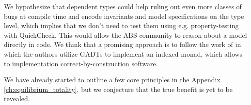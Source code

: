 We hypothesize that dependent types could help ruling out even more classes of bugs at compile time and encode invariants and model specifications on the type level, which implies that we don't need to test them using e.g. property-testing with QuickCheck. This would allow the ABS community to reason about a model directly in code. We think that a promising approach is to follow the work of \cite{brady_programming_2013, fowler_dependent_2014, brady_state_2016} in which the authors utilize GADTs to implement an indexed monad, which allows to implementation correct-by-construction software.

We have already started to outline a few core principles in the Appendix \ref{ch:equilibrium_totality}, but we conjecture that the true benefit is yet to be revealed.